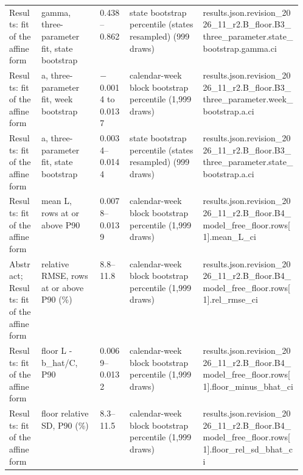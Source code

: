 \begin{table}[!tbp]
\begin{tabularx}{\linewidth}{@{}p{0.11\linewidth}p{0.2\linewidth}lp{0.25\linewidth}X@{}}
Results: fit of the affine form & gamma, three-parameter fit, state bootstrap & 0.438--0.862 & state bootstrap percentile (states resampled) (999 draws) & {\ttfamily\tiny results.\allowbreak{}json.\allowbreak{}revision\_2026\_11\_r2.\allowbreak{}B\_floor.\allowbreak{}B3\_three\_parameter.\allowbreak{}state\_bootstrap.\allowbreak{}gamma.\allowbreak{}ci} \\
Results: fit of the affine form & a, three-parameter fit, week bootstrap & $-$0.0014 to 0.0137 & calendar-week block bootstrap percentile (1,999 draws) & {\ttfamily\tiny results.\allowbreak{}json.\allowbreak{}revision\_2026\_11\_r2.\allowbreak{}B\_floor.\allowbreak{}B3\_three\_parameter.\allowbreak{}week\_bootstrap.\allowbreak{}a.\allowbreak{}ci} \\
Results: fit of the affine form & a, three-parameter fit, state bootstrap & 0.0034--0.0144 & state bootstrap percentile (states resampled) (999 draws) & {\ttfamily\tiny results.\allowbreak{}json.\allowbreak{}revision\_2026\_11\_r2.\allowbreak{}B\_floor.\allowbreak{}B3\_three\_parameter.\allowbreak{}state\_bootstrap.\allowbreak{}a.\allowbreak{}ci} \\
Results: fit of the affine form & mean L, rows at or above P90 & 0.0078--0.0139 & calendar-week block bootstrap percentile (1,999 draws) & {\ttfamily\tiny results.\allowbreak{}json.\allowbreak{}revision\_2026\_11\_r2.\allowbreak{}B\_floor.\allowbreak{}B4\_model\_free\_floor.\allowbreak{}rows\allowbreak{}[1].\allowbreak{}mean\_L\_ci} \\
Abstract; Results: fit of the affine form & relative RMSE, rows at or above P90 (\%) & 8.8--11.8 & calendar-week block bootstrap percentile (1,999 draws) & {\ttfamily\tiny results.\allowbreak{}json.\allowbreak{}revision\_2026\_11\_r2.\allowbreak{}B\_floor.\allowbreak{}B4\_model\_free\_floor.\allowbreak{}rows\allowbreak{}[1].\allowbreak{}rel\_rmse\_ci} \\
Results: fit of the affine form & floor L - b\_hat/C, P90 & 0.0069--0.0132 & calendar-week block bootstrap percentile (1,999 draws) & {\ttfamily\tiny results.\allowbreak{}json.\allowbreak{}revision\_2026\_11\_r2.\allowbreak{}B\_floor.\allowbreak{}B4\_model\_free\_floor.\allowbreak{}rows\allowbreak{}[1].\allowbreak{}floor\_minus\_bhat\_ci} \\
Results: fit of the affine form & floor relative SD, P90 (\%) & 8.3--11.5 & calendar-week block bootstrap percentile (1,999 draws) & {\ttfamily\tiny results.\allowbreak{}json.\allowbreak{}revision\_2026\_11\_r2.\allowbreak{}B\_floor.\allowbreak{}B4\_model\_free\_floor.\allowbreak{}rows\allowbreak{}[1].\allowbreak{}floor\_rel\_sd\_bhat\_ci} \\

\end{tabularx}
\end{table}
